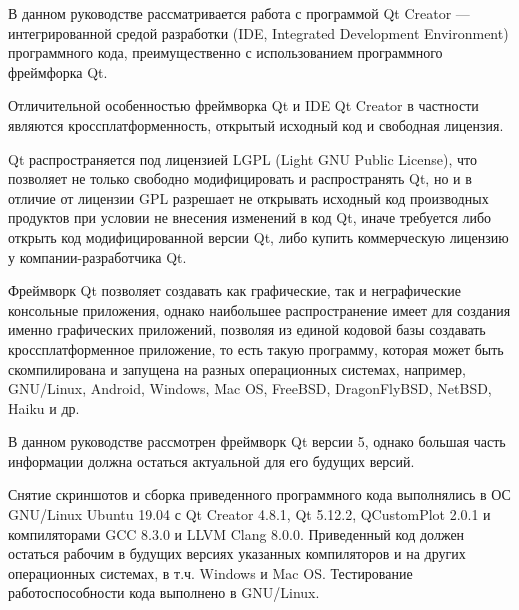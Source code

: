 
В данном руководстве рассматривается работа с программой Qt Creator — интегрированной средой разработки (IDE, Integrated Development Environment) программного кода, преимущественно с использованием программного фреймфорка Qt.

Отличительной особенностью фреймворка Qt и IDE Qt Creator в частности являются кроссплатформенность, открытый исходный код и свободная лицензия.

Qt распространяется под лицензией LGPL (Light GNU Public License), что позволяет не только свободно модифицировать и распространять Qt, но и в отличие от лицензии GPL разрешает не открывать исходный код производных продуктов при условии не внесения изменений в код Qt, иначе требуется либо открыть код модифицированной версии Qt, либо купить коммерческую лицензию у компании-разработчика Qt.

Фреймворк Qt позволяет создавать как графические, так и неграфические консольные приложения, однако наибольшее распространение имеет для создания именно графических приложений, позволяя из единой кодовой базы создавать кроссплатформенное приложение, то есть такую программу, которая может быть скомпилирована и запущена на разных операционных системах, например, GNU/Linux, Android, Windows, Mac OS, FreeBSD, DragonFlyBSD, NetBSD, Haiku и др.

В данном руководстве рассмотрен фреймворк Qt версии 5, однако большая часть информации должна остаться актуальной для его будущих версий.

Снятие скриншотов и сборка приведенного программного кода выполнялись в ОС GNU/Linux Ubuntu 19.04 с Qt Creator 4.8.1, Qt 5.12.2, QCustomPlot 2.0.1 и компиляторами GCC 8.3.0 и LLVM Clang 8.0.0. Приведенный код должен остаться рабочим в будущих версиях указанных компиляторов и на других операционных системах, в т.ч. Windows и Mac OS. Тестирование работоспособности кода выполнено в GNU/Linux.

\clearpage

